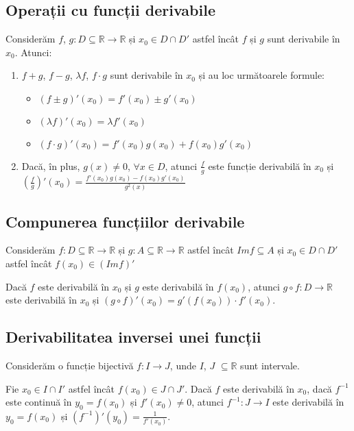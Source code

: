 \subsection{Operații cu funcții derivabile}
Considerăm $f$, $g: D \subseteq \mathbb{R} \rightarrow \mathbb{R}$ și $x_{0} \in D \cap D'$ astfel încât $f$ și $g$ sunt derivabile în $x_{0}$. Atunci:
\begin{enumerate}[label=\emph{\alph*})]
	\item $f+g$, $f-g$, $\lambda f$, $f \cdot g$ sunt derivabile în $x_{0}$ și au loc următoarele formule:
		\begin{itemize}
			\item $(f \pm g)'(x_{0}) = f'(x_{0}) \pm g'(x_{0})$
			\item $(\lambda f)'(x_{0}) = \lambda f'(x_{0})$
			\item $(f \cdot g)'(x_{0}) = f'(x_{0})g(x_{0}) + f(x_{0})g'(x_{0})$
		\end{itemize}
	\item Dacă, în plus, $g(x) \neq 0$, $\forall x \in D$, atunci $\frac{\displaystyle f}{\displaystyle g}$ este funcție derivabilă în $x_{0}$ și \\
		$\left(\displaystyle\frac{f}{g}\right)'(x_{0}) = \frac{\displaystyle f'(x_{0})g(x_{0})-f(x_{0})g'(x_{0})}{\displaystyle g^{2}(x)}$
\end{enumerate}

\subsection{Compunerea funcțiilor derivabile}
Considerăm $f: D \subseteq \mathbb{R} \rightarrow \mathbb{R}$ și $g: A \subseteq \mathbb{R} \rightarrow \mathbb{R}$ astfel încât $Imf \subseteq A$ și $x_{0} \in D \cap D'$
astfel încât $f(x_{0}) \in (Imf)'$

Dacă $f$ este derivabilă în $x_{0}$ și $g$ este derivabilă în $f(x_{0})$, atunci $g \circ f: D \rightarrow \mathbb{R}$ este derivabilă în $x_{0}$ și $(g \circ f)'(x_{0}) = g'(f(x_{0})) \cdot f'(x_{0})$.

\subsection{Derivabilitatea inversei unei funcții}
 Considerăm o funcție bijectivă $f: I \rightarrow J$, unde $I$, $J$ $\subseteq \mathbb{R}$ sunt intervale.

Fie $x_{0} \in I \cap I'$ astfel încât $f(x_{0}) \in J \cap J'$. Dacă $f$ este derivabilă în $x_{0}$, dacă $f^{-1}$ este continuă în $y_{0} = f(x_{0})$ și $f'(x_{0}) \neq 0$,
atunci $f^{-1}: J \rightarrow I$ este derivabilă în $y_{0} = f(x_{0})$ și $(f^{-1})'(y_{0}) = \frac{\displaystyle 1}{\displaystyle f'(x_{0})}$.

